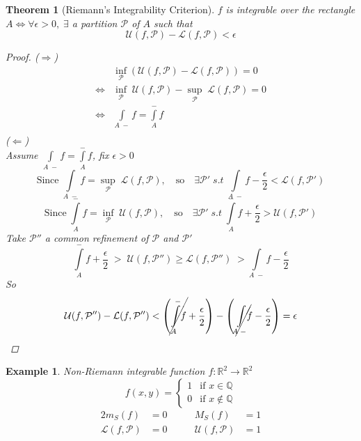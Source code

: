 \documentclass[11pt]{article}
\def\QQ{\mathbb{Q}}
\def\RR{\mathbb{R}}
\newtheorem{theorem}{Theorem}[section]
\newtheorem{example}{Example}[section]
\begin{document}
\begin{theorem}[Riemann's Integrability Criterion]\label{reimann}
$f$ is integrable over the rectangle $A \Leftrightarrow \forall  \epsilon > 0, \; \exists$ a partition $\mathcal{P}$ of $A$ such that 
\[\mathcal{U}(f, \mathcal{P}) - \mathcal{L}(f, \mathcal{P}) < \epsilon \]
\begin{proof}
($ \Rightarrow $)\\
\begin{align*}
&\inf_{\mathcal{P}}(\mathcal{U}(f, \mathcal{P}) - \mathcal{L}(f, \mathcal{P})) = 0\\
\Leftrightarrow &\inf_{\mathcal{P}}\;\mathcal{U}(f, \mathcal{P}) - \sup_{\mathcal{P}}\; \mathcal{L}(f, \mathcal{P}) = 0\\
\Leftrightarrow  &\int\limits_{A \;-}f = \int\limits_{A}^{-}f\\
\end{align*}
($\Leftarrow$)\\
Assume $\int\limits_{A \;-}f = \int\limits_{A}^{-}f$, fix $\epsilon > 0$
\[\text{Since} \; \int\limits_{A \;-}\! f = \sup_{\mathcal{P}} \;\mathcal{L}(f, \mathcal{P}), \quad \text{so} \quad \exists \mathcal{P}' \; s.t \; \int\limits_{A \;-}f - \frac{\epsilon}{2} < \mathcal{L}(f, \mathcal{P}')\]
\[\text{Since} \; \int\limits_{A}^{-}f = \inf_{\mathcal{P}} \;\mathcal{U}(f, \mathcal{P}), \quad \text{so} \quad \exists \mathcal{P}' \; s.t \; \int\limits_{A}^{-}f + \frac{\epsilon}{2} > \mathcal{U}(f, \mathcal{P}')\]
Take $\mathcal{P}''$ a common refinement of $\mathcal{P}$ and $\mathcal{P}'$
\[\int\limits_{A}^{-}f + \frac{\epsilon}{2} \;>\; \mathcal{U}(f, \mathcal{P}'') \geq \mathcal{L}(f, \mathcal{P}'') \;> \int\limits_{A \;-}f - \frac{\epsilon}{2}\]
So
\[\mathcal{U}(f, \mathcal{P}'') - \mathcal{L}(f, \mathcal{P}'') < \left(\cancel{\int\limits_{A}^{-}\!f} + \frac{\epsilon}{2}\right) - \left(\cancel{\int\limits_{A \;-}\!\!f} - \frac{\epsilon}{2}\right) = \epsilon\]
\end{proof}
\end{theorem}

\begin{example} Non-Riemann integrable function $f:\RR^2 \rightarrow \RR^2$
\[f(x,y) =
  \begin{cases}
  1 & \text{if } x \in \QQ \\
   0      & \text{if } x \notin \QQ
  \end{cases} \]
\begin{alignat*}{2}
m_S(f) &= 0 &\qquad M_S(f)&=1\\
\mathcal{L}(f, \mathcal{P}) &= 0 &\qquad \mathcal{U}(f, \mathcal{P}) &=1
\end{alignat*}
\end{example}
\end{document}
